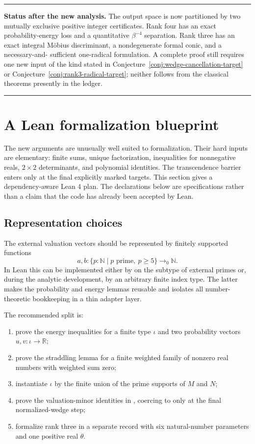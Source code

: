 \documentclass[11pt,oneside]{article}
\theoremstyle{research}
\theoremstyle{definition}
\newcommand{\R}{\mathbb R}
\newcommand{\Z}{\mathbb Z}
\newcommand{\N}{\mathbb N}
\newcommand{\code}[1]{\texttt{\detokenize{#1}}}
\newenvironment{resultbox}
  {\begin{center}\begin{minipage}{0.94\textwidth}\setlength{\parindent}{0pt}%
   \hrule\vspace{0.45em}}
  {\vspace{0.45em}\hrule\end{minipage}\end{center}}
\begin{document}
\begin{resultbox}
\textbf{Status after the new analysis.}
The output space is now partitioned by two mutually exclusive positive
integer certificates.  Rank four has an exact probability-energy loss and a
quantitative $\beta^{-4}$ separation.  Rank three has an exact integral
M\"obius discriminant, a nondegenerate formal conic, and a necessary-and-
sufficient one-radical formulation.  A complete proof still requires one new
input of the kind stated in
Conjecture~\ref{conj:wedge-cancellation-target} or
Conjecture~\ref{conj:rank3-radical-target}; neither follows from the classical
theorems presently in the ledger.
\end{resultbox}

\section{A Lean formalization blueprint}
\label{app:formalization}

The new arguments are unusually well suited to formalization.  Their hard
inputs are elementary: finite sums, unique factorization, inequalities for
nonnegative reals, $2\times2$ determinants, and polynomial identities.  The
transcendence barrier enters only at the final explicitly marked targets.
This section gives a dependency-aware Lean 4 plan.  The declarations below
are specifications rather than a claim that the code has already been
accepted by Lean.

\subsection{Representation choices}

The external valuation vectors should be represented by finitely supported
functions
\[
 a,b:\{p:\N\mid p\text{ prime},\ p\ge5\}\to_0\N.
\]
In Lean this can be implemented either by \code{Finsupp} on the subtype of external
primes or, during the analytic development, by an arbitrary finite index type.
The latter makes the probability and energy lemmas reusable and isolates all
number-theoretic bookkeeping in a thin adapter layer.

The recommended split is:
\begin{enumerate}[label=\textbf{L\arabic*.}]
\item prove the energy inequalities for a finite type $\iota$ and two
  probability vectors $u,v:\iota\to\R$;
\item prove the straddling lemma for a finite weighted family of nonzero real
  numbers with weighted sum zero;
\item instantiate $\iota$ by the finite union of the prime supports of $M$ and
  $N$;
\item prove the valuation-minor identities in \code{\Z}, coercing to \code{\R} only at
  the final normalized-wedge step;
\item formalize rank three in a separate record with six natural-number
  parameters and one positive real $\theta$.
\end{enumerate}
\end{document}
